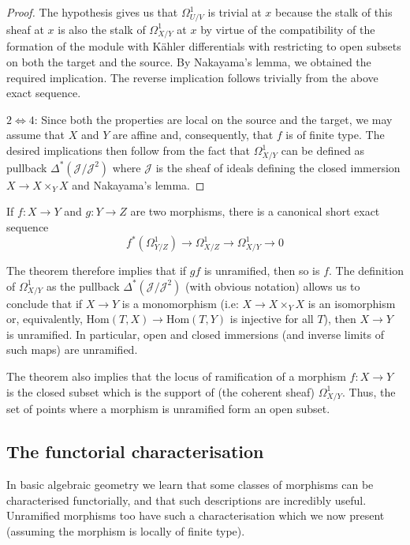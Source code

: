 \begin{proof}
\smallskip\noindent
The hypothesis gives us that $\Omega^1_{U/V}$ is trivial at $x$ because the
stalk of this sheaf at $x$ is also the stalk of $\Omega^1_{X/Y}$ at $x$ by
virtue of the compatibility of the formation of the module with K\"ahler
differentials with restricting to open subsets on both the target and the
source. By Nakayama's lemma, we obtained the required implication. The reverse
implication follows trivially from the above exact sequence.

\smallskip\noindent
$2 \Longleftrightarrow 4$: Since both the properties are local on the source
and the target, we may assume that $X$ and $Y$ are affine and, consequently,
that $f$ is of finite type. The desired implications then follow from the fact
that $\Omega^1_{X/Y}$ can be defined as pullback $\Delta^*(\mathcal{J}/\mathcal{J}^2)$ where
$\mathcal{J}$ is the sheaf of ideals defining the closed immersion $X \to X \times_Y X$
and Nakayama's lemma.
\end{proof}

\noindent
If $f:X \to Y$ and $g:Y \to Z$ are two morphisms, there is a canonical short
exact sequence
$$
f^*(\Omega^1_{Y/Z}) \to \Omega^1_{X/Z} \to \Omega^1_{X/Y} \to 0
$$

\smallskip\noindent
The theorem therefore implies that if $gf$ is unramified, then so is $f$. The
definition of $\Omega^1_{X/Y}$ as the pullback  $\Delta^*(\mathcal{J}/\mathcal{J}^2)$ (with
obvious notation) allows us to conclude that if $X \to Y$ is a monomorphism
(i.e: $X \to X \times_Y X$ is an isomorphism or, equivalently,
$\text{Hom}(T,X) \to \text{Hom}(T,Y)$ is injective for all $T$), then $X \to Y$ is
unramified. In particular, open and closed immersions (and inverse limits of
such maps) are unramified.

\smallskip\noindent
The theorem also implies that the locus of ramification of a morphism
$f:X \to Y$ is the closed subset which is the support of (the coherent sheaf)
$\Omega^1_{X/Y}$. Thus, the set of points where a morphism is unramified form
an open subset.

\subsection{The functorial characterisation}
\label{subsection-functorial-unramified}

\noindent
In basic algebraic geometry we learn that some classes of morphisms can be
characterised functorially, and that such descriptions are incredibly useful.
Unramified morphisms too have such a characterisation which we now present
(assuming the morphism is locally of finite type).

